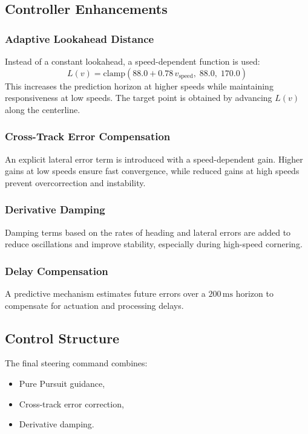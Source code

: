 \documentclass[twocolumn]{article}
\begin{document}
\subsection{Controller Enhancements}

\subsubsection{Adaptive Lookahead Distance}
Instead of a constant lookahead, a speed-dependent function is used:
\begin{equation}
L(v) = \mathrm{clamp}\left(88.0 + 0.78\, v_{\mathrm{speed}}, \; 88.0, \; 170.0 \right)
\end{equation}
This increases the prediction horizon at higher speeds while maintaining responsiveness at low speeds. The target point is obtained by advancing $L(v)$ along the centerline.

\subsubsection{Cross-Track Error Compensation}
An explicit lateral error term is introduced with a speed-dependent gain. Higher gains at low speeds ensure fast convergence, while reduced gains at high speeds prevent overcorrection and instability.

\subsubsection{Derivative Damping}
Damping terms based on the rates of heading and lateral errors are added to reduce oscillations and improve stability, especially during high-speed cornering.

\subsubsection{Delay Compensation}
A predictive mechanism estimates future errors over a $200\,\mathrm{ms}$ horizon to compensate for actuation and processing delays.

\subsection{Control Structure}

The final steering command combines:
\begin{itemize}
    \item Pure Pursuit guidance,
    \item Cross-track error correction,
    \item Derivative damping.
\end{itemize}
\end{document}
